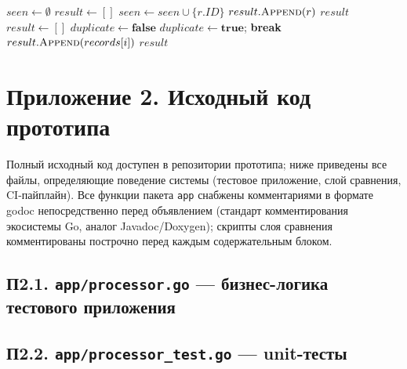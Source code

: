 \begin{algorithm}[htbp]
\caption{Deduplicate --- эталонная ($O(n)$) и регрессионная ($O(n^2)$) реализации}
\label{alg:dedup}
\begin{algorithmic}[1]
 
  \State $seen \gets \emptyset$ 
  \State $result \gets []$
      \State $seen \gets seen \cup \{r.ID\}$
      \State $result.\Call{Append}{r}$
    \EndIf
  \EndFor
  \State \Return $result$
\EndFunction
\Statex
{} 
  \State $result \gets []$
    \State $duplicate \gets \textbf{false}$
     
        \State $duplicate \gets \textbf{true}$; \textbf{break}
      \EndIf
    \EndFor
      \State $result.\Call{Append}{records[i]}$
    \EndIf
  \EndFor
  \State \Return $result$
\EndFunction
\end{algorithmic}
\end{algorithm}

\clearpage
\section*{Приложение 2. Исходный код прототипа}
\label{app:code}

Полный исходный код доступен в репозитории прототипа; ниже приведены все
файлы, определяющие поведение системы (тестовое приложение, слой сравнения,
CI-пайплайн). Все функции пакета \texttt{app} снабжены комментариями в
формате godoc непосредственно перед объявлением (стандарт комментирования
экосистемы Go, аналог Javadoc/Doxygen); скрипты слоя сравнения
комментированы построчно перед каждым содержательным блоком.

\subsection*{П2.1. \texttt{app/\allowbreak processor.go} --- бизнес-логика тестового приложения}


\subsection*{П2.2. \texttt{app/\allowbreak processor\_test.go} --- unit-тесты}


